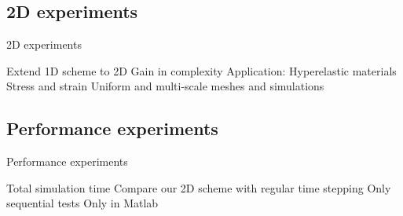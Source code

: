 \subsection{2D experiments}
\begin{frame}{2D experiments}
    \pause\begin{itemize}[<+->]
        \itemv Extend 1D scheme to 2D
        \itemv Gain in complexity
        \itemv Application: Hyperelastic materials
        \itemv Stress and strain
        \itemv Uniform and multi-scale meshes and simulations
    \end{itemize}
\end{frame}

\subsection{Performance experiments}
\begin{frame}{Performance experiments}
    \pause\begin{itemize}[<+->]
        \itemv Total simulation time
        \itemv Compare our 2D scheme with regular time stepping
        \itemv Only sequential tests
        \itemv Only in Matlab
    \end{itemize}
\end{frame}


